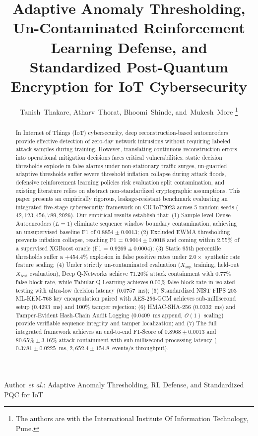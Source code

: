 \documentclass[journal]{IEEEtran}
\begin{document}
\title{Adaptive Anomaly Thresholding, Un-Contaminated Reinforcement Learning Defense, and Standardized Post-Quantum Encryption for IoT Cybersecurity}

\author{Tanish~Thakare,
        Atharv~Thorat,
        Bhoomi~Shinde,
        and~Mukesh~More%
\thanks{The authors are with the International Institute Of Information Technology, Pune.}}

%
{Author \MakeLowercase{\textit{et al.}}: Adaptive Anomaly Thresholding, RL Defense, and Standardized PQC for IoT}

\maketitle

\begin{abstract}
In Internet of Things (IoT) cybersecurity, deep reconstruction-based autoencoders provide effective detection of zero-day network intrusions without requiring labeled attack samples during training. However, translating continuous reconstruction errors into operational mitigation decisions faces critical vulnerabilities: static decision thresholds explode in false alarms under non-stationary traffic surges, un-guarded adaptive thresholds suffer severe threshold inflation collapse during attack floods, defensive reinforcement learning policies risk evaluation split contamination, and existing literature relies on abstract non-standardized cryptographic assumptions. This paper presents an empirically rigorous, leakage-resistant benchmark evaluating an integrated five-stage cybersecurity framework on CICIoT2023 across 5 random seeds ($42, 123, 456, 789, 2026$). Our empirical results establish that: (1) Sample-level Dense Autoencoders ($L=1$) eliminate sequence window boundary contamination, achieving an unsupervised baseline F1 of $0.8854 \pm 0.0013$; (2) Excluded EWMA thresholding prevents inflation collapse, reaching F1 = $0.9014 \pm 0.0018$ and coming within 2.55\% of a supervised XGBoost oracle (F1 = $0.9269 \pm 0.0004$); (3) Static 95th percentile thresholds suffer a +454.4\% explosion in false positive rates under $2.0\times$ synthetic rate feature scaling; (4) Under strictly un-contaminated evaluation ($X_{\text{sup}}$ training, held-out $X_{\text{test}}$ evaluation), Deep Q-Networks achieve $71.20\%$ attack containment with $0.77\%$ false block rate, while Tabular Q-Learning achieves $0.00\%$ false block rate in isolated testing with ultra-low decision latency ($0.0757$~ms); (5) Standardized NIST FIPS 203 ML-KEM-768 key encapsulation paired with AES-256-GCM achieves sub-millisecond setup ($0.4293$~ms) and 100\% tamper rejection; (6) HMAC-SHA-256 ($0.0332$~ms) and Tamper-Evident Hash-Chain Audit Logging ($0.0409$~ms append, $\mathcal{O}(1)$ scaling) provide verifiable sequence integrity and tamper localization; and (7) The full integrated framework achieves an end-to-end F1-Score of $0.8968 \pm 0.0013$ and $80.65\% \pm 3.16\%$ attack containment with sub-millisecond processing latency ($0.3781 \pm 0.0225$~ms, $2,652.4 \pm 154.8$~events/s throughput).
\end{abstract}
\end{document}
